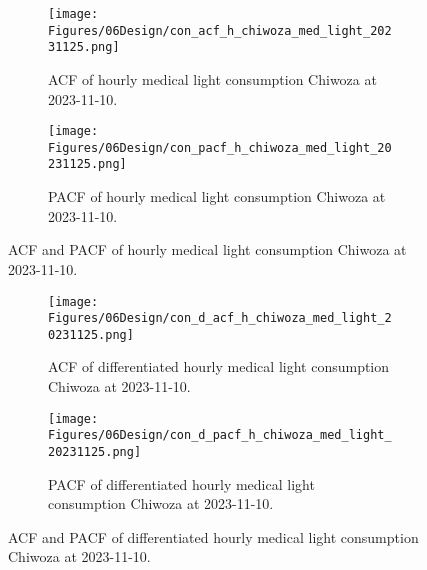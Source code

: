 \begin{figure}[]
  \centering

  \begin{subfigure}{\textwidth}
    \centering
    \texttt{[image: Figures/06Design/con\_acf\_h\_chiwoza\_med\_light\_20231125.png]}
    \caption[ACF Medical light consumption 20231110]{ACF of hourly medical light consumption Chiwoza at 2023-11-10.}
    \label{fig:con_acf_h_chiwoza_med_light_20231125}
  \end{subfigure}

  \vspace{0.5cm}

  \begin{subfigure}{\textwidth}
    \centering
    \texttt{[image: Figures/06Design/con\_pacf\_h\_chiwoza\_med\_light\_20231125.png]}
    \caption[ACF Medical light consumption 20231110]{PACF of hourly medical light consumption Chiwoza at 2023-11-10.}
    \label{fig:con_pacf_h_chiwoza_med_light_20231125}
  \end{subfigure}

  \caption[ACF and PACF Medical light consumption 20231110]{ACF and PACF of hourly medical light consumption Chiwoza at 2023-11-10.}
  \label{fig:con_acf_pacf_h_chiwoza_med_light_20231125}
\end{figure}

\begin{figure}[]
  \centering

  \begin{subfigure}{\textwidth}
    \centering
    \texttt{[image: Figures/06Design/con\_d\_acf\_h\_chiwoza\_med\_light\_20231125.png]}
    \caption[ACF differentiated Medical light consumption 20231110]{ACF of differentiated hourly medical light consumption Chiwoza at 2023-11-10.}
    \label{fig:con_d_acf_h_chiwoza_med_light_20231125}
  \end{subfigure}

  \vspace{0.5cm}

  \begin{subfigure}{\textwidth}
    \centering
    \texttt{[image: Figures/06Design/con\_d\_pacf\_h\_chiwoza\_med\_light\_20231125.png]}
    \caption[PACF differentiated medical light consumption 20231110]{PACF of differentiated  hourly medical light consumption Chiwoza at 2023-11-10.}
    \label{fig:con_d_pacf_h_chiwoza_med_light_20231125}
  \end{subfigure}

  \caption[ACF and PACF differentiated medical light consumption 20231110]{ACF and PACF of differentiated hourly medical light consumption Chiwoza at 2023-11-10.}
  \label{fig:con_d_acf_pacf_h_chiwoza_med_light_20231125}
\end{figure}


